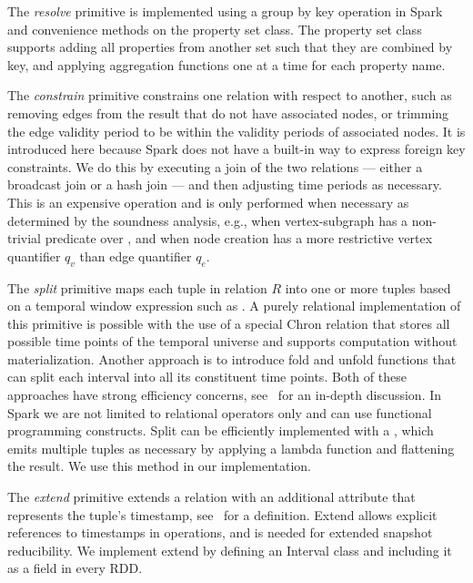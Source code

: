 

The {\em resolve} primitive is implemented using a group by key
operation in Spark and convenience methods on the property set class.
The property set class supports adding all properties from another set
such that they are combined by key, and applying aggregation functions
one at a time for each property name.

The {\em constrain} primitive constrains one relation with respect to
another, such as removing edges from the result that do not have
associated nodes, or trimming the edge validity period to be within
the validity periods of associated nodes.  It is introduced here
because Spark does not have a built-in way to express foreign key
constraints.  We do this by executing a join of the two relations ---
either a broadcast join or a hash join --- and then adjusting time
periods as necessary.  This is an expensive operation and is only
performed when necessary as determined by the soundness analysis,
e.g., when vertex-subgraph has a non-trivial predicate over \tve, and
when node creation has a more restrictive vertex quantifier $q_v$ than
edge quantifier $q_e$.

The {\em split} primitive maps each tuple in relation $R$ into one or
more tuples based on a temporal window expression such as
.  A purely relational implementation of this
primitive is possible with the use of a special Chron relation that
stores all possible time points of the temporal universe and supports
computation without materialization.  Another approach is to introduce
fold and unfold functions that can split each interval into all its
constituent time points.  Both of these approaches have strong
efficiency concerns, see~\cite{DBLP:conf/time/BohlenGJ06} for an
in-depth discussion.  In Spark we are not limited to relational
operators only and can use functional programming constructs.  Split
can be efficiently implemented with a , which emits
multiple tuples as necessary by applying a lambda function and
flattening the result.  We use this method in our implementation.

The {\em extend} primitive extends a relation with an additional
attribute that represents the tuple's timestamp, see~\cite{Dignos2012}
for a definition.  Extend allows explicit references to timestamps in
operations, and is needed for extended snapshot reducibility.  We
implement extend by defining an Interval class and including it as a
field in every RDD.

